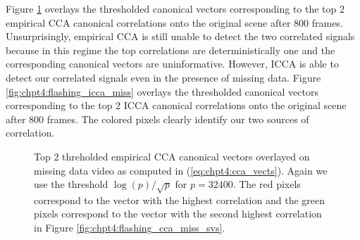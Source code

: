 Figure \ref{fig:chpt4:flashing_cca_miss} overlays the thresholded canonical vectors
corresponding to the top 2 empirical CCA canonical correlations onto the original scene after 800
frames. Unsurprisingly, empirical CCA is still unable to detect the two correlated signals because
in this regime the top correlations are deterministically one and the corresponding
canonical vectors are uninformative. However, ICCA is able to detect our correlated
signals even in the presence of missing data. Figure \ref{fig:chpt4:flashing_icca_miss}
overlays the thresholded canonical vectors corresponding to the top 2 ICCA canonical
correlations onto the original scene after 800 frames. The colored pixels clearly identify
our two sources of correlation. 

\begin{figure}
  \begin{center}
    \caption{Top 2 threholded empirical CCA canonical vectors overlayed on missing data
      video as computed in (\ref{eq:chpt4:cca_vects}). Again we use the threshold
      $\log(p)/\sqrt{p}$ for $p=32400$. The red pixels correspond to the vector with the
      highest correlation and the green pixels correspond to the vector with the second
      highest correlation in Figure \ref{fig:chpt4:flashing_cca_miss_svs}.}
    \label{fig:chpt4:flashing_cca_miss}
  \end{center}
\end{figure}

